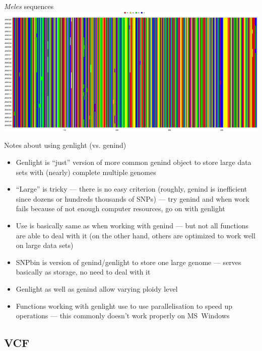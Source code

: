 \documentclass[compress, ucs, xelatex, 11pt, xcolor=svgnames,
  hyperref={
    bookmarks=true,
    unicode=true,
    colorlinks=true,
    pdftitle={Molecular data in R},
    plainpages=false,
    pdfauthor={Vojtech Zeisek},
    pdfsubject={Course about phylogeny and evolution in R},
    pdfcreator={XeLaTeX},
    pdfkeywords={R, evolution, phylogeny, molecular data},
    linkcolor=Tomato,
    anchorcolor=SaddleBrown,
    citecolor=Goldenrod,
    filecolor=DarkMagenta,
    menucolor=Sienna,
    urlcolor=DarkTurquoise,
    pdftex},
  url={hyphens, lowtilde} %
  ]{beamer}
\begin{document}
\begin{frame}{\textit{Meles} sequences}
  \includegraphics[width=\textwidth]{sequences_meles.png}
\end{frame}

\begin{frame}{Notes about using genlight (vs. genind)}
  \begin{itemize}
    \item Genlight is ``just'' version of more common genind object to store large data sets with (nearly) complete multiple genomes
    \item ``Large'' is tricky --- there is no easy criterion (roughly, genind is inefficient since dozens or hundreds thousands of SNPs) --- try genind and when work fails because of not enough computer resources, go on with genlight
    \item Use is basically same as when working with genind --- but not all functions are able to deal with it (on the other hand, others are optimized to work well on large data sets)
    \item SNPbin is version of genind/genlight to store one large genome --- serves basically as storage, no need to deal with it
    \item Genlight as well as genind allow varying ploidy level
    \item Functions working with genlight use to use parallelisation to speed up operations --- this commonly doesn't work properly on MS~Windows
  \end{itemize}
\end{frame}

\subsection{VCF}
\end{document}
